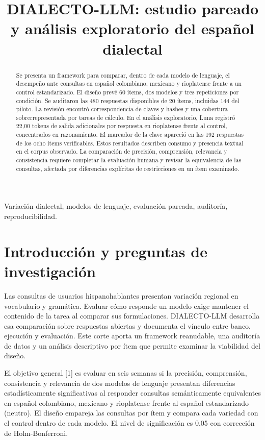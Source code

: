 \documentclass[conference]{IEEEtran}
\title{DIALECTO-LLM: estudio pareado y análisis exploratorio del español dialectal}
\author{\IEEEauthorblockN{Grupo 3 · Corte de datos: 13 de noviembre de 2026}}
\begin{document}
\maketitle
\begin{abstract}
Se presenta un framework para comparar, dentro de cada modelo de lenguaje, el desempeño ante consultas en español colombiano, mexicano y rioplatense frente a un control estandarizado. El diseño prevé 60 ítems, dos modelos y tres repeticiones por condición. Se auditaron las 480 respuestas disponibles de 20 ítems, incluidas 144 del piloto. La revisión encontró correspondencia de claves y hashes y una cobertura sobrerrepresentada por tareas de cálculo. En el análisis exploratorio, Luna registró 22,00 tokens de salida adicionales por respuesta en rioplatense frente al control, concentrados en razonamiento. El marcador de la clave apareció en las 192 respuestas de los ocho ítems verificables. Estos resultados describen consumo y presencia textual en el corpus observado. La comparación de precisión, comprensión, relevancia y consistencia requiere completar la evaluación humana y revisar la equivalencia de las consultas, afectada por diferencias explícitas de restricciones en un ítem examinado.
\end{abstract}
\begin{IEEEkeywords}
Variación dialectal, modelos de lenguaje, evaluación pareada, auditoría, reproducibilidad.
\end{IEEEkeywords}
\section{Introducción y preguntas de investigación}
Las consultas de usuarios hispanohablantes presentan variación regional en vocabulario y gramática. Evaluar cómo responde un modelo exige mantener el contenido de la tarea al comparar sus formulaciones. DIALECTO-LLM desarrolla esa comparación sobre respuestas abiertas y documenta el vínculo entre banco, ejecución y evaluación. Este corte aporta un framework reanudable, una auditoría de datos y un análisis descriptivo por ítem que permite examinar la viabilidad del diseño.

El objetivo general [1] es evaluar en seis semanas si la precisión, comprensión, consistencia y relevancia de dos modelos de lenguaje presentan diferencias estadísticamente significativas al responder consultas semánticamente equivalentes en español colombiano, mexicano y rioplatense frente al español estandarizado (neutro). El diseño empareja las consultas por ítem y compara cada variedad con el control dentro de cada modelo. El nivel de significación es 0,05 con corrección de Holm-Bonferroni.
\end{document}
